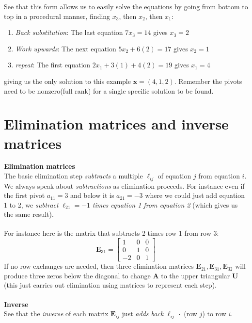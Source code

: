 \documentclass{report}
\begin{document}
See that this form allows us to easily solve the equations by going from bottom to top in a procedural manner, finding $x_3$, then $x_2$, then $x_1$:
\begin{enumerate}
\item\textit{Back substitution}: The last equation $7x_3=14$ gives $x_3=2$
\item\textit{Work upwards}: The next equation $5x_2+6(2)=17$ gives $x_2=1$
\item\textit{repeat}: The first equation $2x_1+3(1)+4(2)=19$ gives $x_1=4$
\end{enumerate}
giving us the only solution to this example $\bm x=(4,1,2)$. Remember the pivots need to be nonzero(full rank) for a single specific solution to be found.
\newpage

\section{Elimination matrices and inverse matrices}
\textbf{Elimination matrices}\\
The basic elimination step \textit{subtracts} a multiple $\ell_{ij}$ of equation $j$ from equation $i$. We always speak about \textit{subtractions} as elimination 
proceeds. For instance even if the first pivot $a_{11}=3$ and below it is
$a_{21}=-3$ where we could just add equation 1 to 2, we \textit{subtract} $\ell_{21}=-1$ \textit{times equation 1 from equation 2} (which gives
us the same result).\\
\vspace{1mm}\\
For instance here is the matrix that subtracts 2 times row 1 from row 3:
\begin{equation*}
\bm E_{31}=\left[\begin{array}{ccc}
1&0&0\\0&1&0\\-2&0&1\end{array}\right]
\end{equation*} 
If no row exchanges are needed, then three elimination matrices $\bm E_{21},
\bm E_{31},\bm E_{32}$ will produce three zeros below the diagonal to change $\bm A$ to the upper triangular $\bm U$(this just carries out elimination 
using matrices to represent each step).\\
\vspace{1mm}\\
\textbf{Inverse}\\
See that the \textit{inverse} of each matrix $\bm E_{ij}$ just \textit{adds back} $\ell_{ij}\,\cdot$ (row $j$) to row $i$. 
\end{document}
